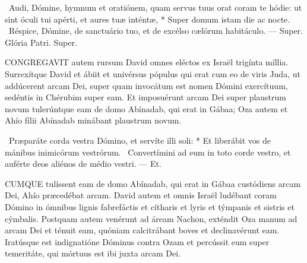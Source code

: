 \R\ Audi, Dómine, hymnum et oratiónem, quam servus tuus orat coram te hódie: ut sint óculi tui apérti, et aures tuæ inténtæ, * Super domum istam die ac nocte. \V\ Réspice, Dómine, de sanctuário tuo, et de excélso cælórum habitáculo. --- Super. Glória Patri. Super.




\lettrine[lines=2]{C}{ONGREGAVIT} autem rursum David omnes eléctos ex Israël trigínta míllia. Surrexítque David et ábiit et univérsus pópulus qui erat cum eo de viris Juda, ut addúcerent arcam Dei, super quam invocátum est nomen Dómini exercítuum, sedéntis in Chérubim super eam. Et imposuérunt arcam Dei super plaustrum novum tulerúntque eam de domo Abínadab, qui erat in Gábaa; Oza autem et Ahío fílii Abínadab minábant plaustrum novum.

\R\ Præparáte corda vestra Dómino, et servíte illi soli: * Et liberábit vos de mánibus inimicórum vestrórum. \V\ Convertímini ad eum in toto corde vestro, et auférte deos aliénos de médio vestri. --- Et.


\lettrine[lines=2]{C}{UMQUE} tulíssent eam de domo Abínadab, qui erat in Gábaa custódiens arcam Dei, Ahío præcedébat arcam. David autem et omnis Israël ludébant coram Dómino in ómnibus lignis fabrefáctis et cítharis et lyris et týmpanis et sistris et cýmbalis. Postquam autem venérunt ad áream Nachon, exténdit Oza manum ad arcam Dei et ténuit eam, quóniam calcitrábant boves et declinavérunt eam. Iratúsque est indignatióne Dóminus contra Ozam et percússit eum super temeritáte, qui mórtuus est ibi juxta arcam Dei.

